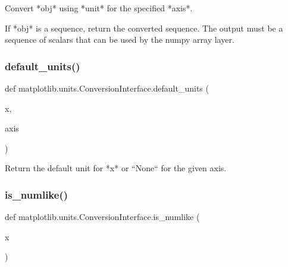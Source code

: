 \begin{DoxyVerb}Convert *obj* using *unit* for the specified *axis*.

If *obj* is a sequence, return the converted sequence.  The output must
be a sequence of scalars that can be used by the numpy array layer.
\end{DoxyVerb}
 \mbox{\label{classmatplotlib_1_1units_1_1ConversionInterface_ab979f9bc68cc2c125913a60a3f37061d}} 
\subsubsection{\texorpdfstring{default\+\_\+units()}{default\_units()}}
{\footnotesize\ttfamily def matplotlib.\+units.\+Conversion\+Interface.\+default\+\_\+units (\begin{DoxyParamCaption}\item[{}]{x,  }\item[{}]{axis }\end{DoxyParamCaption})\hspace{0.3cm}{\ttfamily [static]}}

\begin{DoxyVerb}Return the default unit for *x* or ``None`` for the given axis.\end{DoxyVerb}
 \mbox{\label{classmatplotlib_1_1units_1_1ConversionInterface_a236629416d3c8ebe029a45494fcef0bd}} 
\subsubsection{\texorpdfstring{is\+\_\+numlike()}{is\_numlike()}}
{\footnotesize\ttfamily def matplotlib.\+units.\+Conversion\+Interface.\+is\+\_\+numlike (\begin{DoxyParamCaption}\item[{}]{x }\end{DoxyParamCaption})\hspace{0.3cm}{\ttfamily [static]}}

